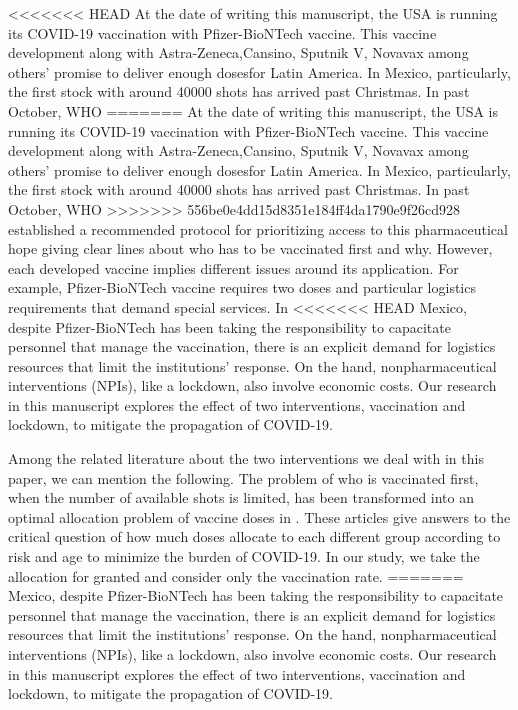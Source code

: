 <<<<<<< HEAD
At the date of writing this manuscript, the USA is running its COVID-19
vaccination with Pfizer-BioNTech vaccine. This vaccine development along with
Astra-Zeneca,Cansino, Sputnik V, Novavax among others' promise to deliver
enough dosesfor Latin America. In Mexico, particularly, the first stock with
around \num{40 000} shots has arrived past Christmas. In past October, WHO
=======
At the date of writing this manuscript, the USA is running its COVID-19 
vaccination with Pfizer-BioNTech vaccine. This vaccine development along with 
Astra-Zeneca,Cansino, Sputnik V, Novavax among others' promise to deliver 
enough dosesfor Latin America. In Mexico, particularly, the first stock with 
around \num{40 000} shots has arrived past Christmas. In past October, WHO 
>>>>>>> 556be0e4dd15d8351e184ff4da1790e9f26cd928
established a recommended protocol for prioritizing access to this
pharmaceutical hope giving clear lines about who has to be vaccinated first
and why. However, each developed vaccine implies different issues around its
application. For example, Pfizer-BioNTech vaccine requires two doses and
particular logistics requirements that demand special services. In
<<<<<<< HEAD
Mexico, despite Pfizer-BioNTech has been taking the responsibility to
capacitate personnel that manage the vaccination, there is an explicit demand
for logistics resources that limit the institutions' response. On the hand,
nonpharmaceutical interventions (NPIs), like a lockdown, also involve economic
costs.  Our research in this manuscript explores the effect of two
interventions, vaccination and lockdown, to mitigate the  propagation of
COVID-19.


Among the related literature about the two interventions we deal with in this
paper, we can mention the following. The problem of who is vaccinated first,
when the number of  available shots is limited, has been transformed into an
optimal allocation problem of vaccine doses in \cite{Bubar2020,Matrajt2020}.
These articles give answers to the critical question of how much doses
allocate to each different group according to risk and age to minimize the
burden of COVID-19. In our study, we take the allocation for granted and
consider only the vaccination rate.
=======
Mexico, despite Pfizer-BioNTech has been taking the responsibility to 
capacitate personnel that manage the vaccination, there is an explicit demand 
for logistics resources that limit the institutions' response. On the hand, 
nonpharmaceutical interventions (NPIs), like a lockdown, also involve economic 
costs.  Our research in this manuscript explores the effect of two 
interventions, vaccination and lockdown, to mitigate the  propagation of 
COVID-19.


